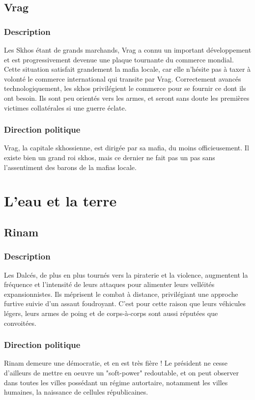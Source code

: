 \subsection{Vrag}
\subsubsection{Description}
Les Skhos étant de grands marchands, Vrag a connu un important développement et est progressivement devenue une plaque tournante du commerce mondial. Cette situation satisfait grandement la mafia locale, car elle n'hésite pas à taxer à volonté le commerce international qui transite par Vrag. Correctement avancés technologiquement, les skhos privilégient le commerce pour se fournir ce dont ils ont besoin. Ils sont peu orientés vers les armes, et seront sans doute les premières victimes collatérales si une guerre éclate.
\subsubsection{Direction politique}
Vrag, la capitale skhossienne, est dirigée par sa mafia, du moins officieusement. Il existe bien un grand roi skhos, mais ce dernier ne fait pas un pas sans l'assentiment des barons de la mafias locale.
\section{L'eau et la terre}
\subsection{Rinam}
\subsubsection{Description}
Les Dalcés, de plus en plus tournés vers la piraterie et la violence, augmentent la fréquence et l'intensité de leurs attaques pour alimenter leurs velléités expansionnistes. Ils méprisent le combat à distance, privilégiant une approche furtive suivie d'un assaut foudroyant. C'est pour cette raison que leurs véhicules légers, leurs armes de poing et de corps-à-corps sont aussi réputées que convoitées.
\subsubsection{Direction politique}
Rinam demeure une démocratie, et en est très fière ! Le président ne cesse d'ailleurs de mettre en oeuvre un "soft-power" redoutable, et on peut observer dans toutes les villes possédant un régime autortaire, notamment les villes humaines, la naissance de cellules républicaines.

